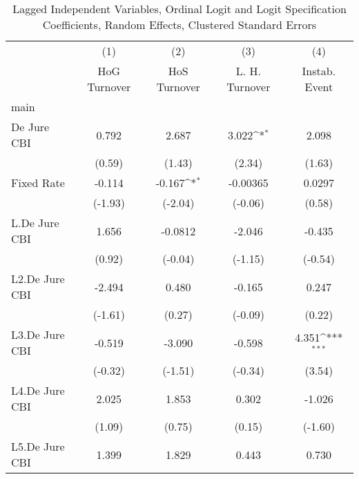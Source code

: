 {
\def\sym#1{\ifmmode^{#1}\else\(^{#1}\)\fi}
\begin{longtable}{l*{4}{c}}
\caption{Lagged Independent Variables, Ordinal Logit and Logit Specification Coefficients, Random Effects, Clustered Standard Errors \label{lagordLogLogDJ}}\\
\hline\hline\endfirsthead\hline\endhead\hline\endfoot\endlastfoot
                &\multicolumn{1}{c}{(1)}&\multicolumn{1}{c}{(2)}&\multicolumn{1}{c}{(3)}&\multicolumn{1}{c}{(4)}\\
                &\multicolumn{1}{c}{HoG Turnover}&\multicolumn{1}{c}{HoS Turnover}&\multicolumn{1}{c}{L. H. Turnover}&\multicolumn{1}{c}{Instab. Event}\\
\hline
main            &                  &                  &                  &                  \\
De Jure CBI     &    0.792         &    2.687         &    3.022\sym{*}  &    2.098         \\
                &   (0.59)         &   (1.43)         &   (2.34)         &   (1.63)         \\
[1em]
Fixed Rate      &   -0.114         &   -0.167\sym{*}  & -0.00365         &   0.0297         \\
                &  (-1.93)         &  (-2.04)         &  (-0.06)         &   (0.58)         \\
[1em]
L.De Jure CBI   &    1.656         &  -0.0812         &   -2.046         &   -0.435         \\
                &   (0.92)         &  (-0.04)         &  (-1.15)         &  (-0.54)         \\
[1em]
L2.De Jure CBI  &   -2.494         &    0.480         &   -0.165         &    0.247         \\
                &  (-1.61)         &   (0.27)         &  (-0.09)         &   (0.22)         \\
[1em]
L3.De Jure CBI  &   -0.519         &   -3.090         &   -0.598         &    4.351\sym{***}\\
                &  (-0.32)         &  (-1.51)         &  (-0.34)         &   (3.54)         \\
[1em]
L4.De Jure CBI  &    2.025         &    1.853         &    0.302         &   -1.026         \\
                &   (1.09)         &   (0.75)         &   (0.15)         &  (-1.60)         \\
[1em]
L5.De Jure CBI  &    1.399         &    1.829         &    0.443         &    0.730         \\

\end{longtable}}
